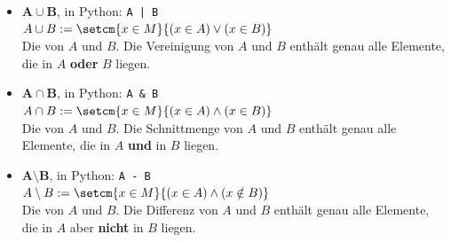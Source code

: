 \begin{itemize}
	\item $\mathbf{A \cup B}$, in Python: \lstinline/A | B/\\
	      $A \cup B := \setcm{x\in M}{(x\in A) \lor (x\in B)}$\\
	      Die  von $A$ und $B$. Die Vereinigung von $A$ und $B$ enthält genau alle Elemente, die in $A$ \textbf{oder} $B$ liegen.
	      \begin{center}
	      \end{center}
	\item $\mathbf{A \cap B}$, in Python: \lstinline|A & B|\\
	      $A \cap B := \setcm{x\in M}{(x\in A) \land (x\in B)}$\\
	      Die  von $A$ und $B$. Die Schnittmenge von $A$ und $B$ enthält genau alle Elemente, die in $A$ \textbf{und} in $B$ liegen.
	      \begin{center}
	      \end{center}
	\item $\mathbf{A\setminus B}$, in Python: \lstinline|A - B|\\
	      $A\setminus B := \setcm{x\in M}{(x\in A) \land (x\notin B)}$\\
	      Die  von $A$ und $B$. Die Differenz von $A$ und $B$ enthält genau alle Elemente, die in $A$ aber \textbf{nicht} in $B$ liegen.
	      \begin{center}
\end{center}
\end{itemize}
